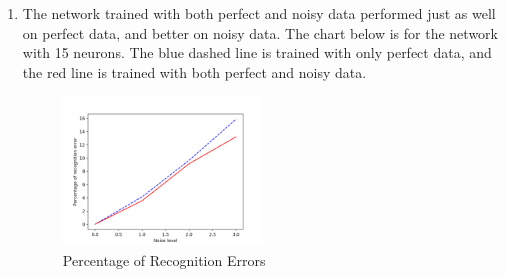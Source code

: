 \documentclass[11pt]{article}
\begin{document}
\begin{enumerate}
\begin{enumerate}
\item The network trained with both perfect and noisy data performed just as well on perfect data, and better on noisy data. The chart below is for the network with 15 neurons. The blue dashed line is trained with only perfect data, and the red line is trained with both perfect and noisy data.\\
\begin{figure}[h!]
    \centering
     \includegraphics[height=0.5\textwidth, width=0.5\textwidth]{q2-c}
        \caption{Percentage of Recognition Errors}
\end{figure}

\end{enumerate}

\end{enumerate}
\end{document}
